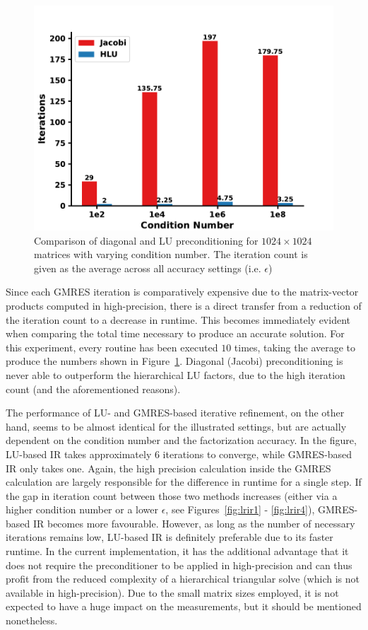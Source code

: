 \begin{figure}[h]
    \centering
    \includegraphics[width=0.7\linewidth]{chapters/5_experiments/figures/LR_iter.pdf}
    \caption[Low-Rank IR - GMRES Iterations]{Comparison of diagonal and LU preconditioning for $1024 \times 1024$ matrices with varying condition number. The iteration count is given as the average across all accuracy settings (i.e. $\epsilon$)}
    \label{fig:lr_ir_iter}
\end{figure}

Since each GMRES iteration is comparatively expensive due to the matrix-vector products computed in high-precision, there is a direct transfer from a reduction of the iteration count to a decrease in runtime. This becomes immediately evident when comparing the total time necessary to produce an accurate solution. For this experiment, every routine has been executed $10$ times, taking the average to produce the numbers shown in Figure~\hyperref[fig:lr_ir_iter]{\ref{fig:lr_ir_iter}}. Diagonal (Jacobi) preconditioning is never able to outperform the hierarchical LU factors, due to the high iteration count (and the aforementioned reasons). 

The performance of LU- and GMRES-based iterative refinement, on the other hand, seems to be almost identical for the illustrated settings, but are actually dependent on the condition number and the factorization accuracy. In the figure, LU-based IR takes approximately 6 iterations to converge, while GMRES-based IR only takes one. Again, the high precision calculation inside the GMRES calculation are largely responsible for the difference in runtime for a single step. If the gap in iteration count between those two methods increases (either via a higher condition number or a lower $\epsilon$, see Figures~\hyperref[fig:lrir1]{\ref{fig:lrir1}} - \hyperref[fig:lrir4]{\ref{fig:lrir4}}), GMRES-based IR becomes more favourable. However, as long as the number of necessary iterations remains low, LU-based IR is definitely preferable due to its faster runtime. In the current implementation, it has the additional advantage that it does not require the preconditioner to be applied in high-precision and can thus profit from the reduced complexity of a hierarchical triangular solve (which is not available in high-precision). Due to the small matrix sizes employed, it is not expected to have a huge impact on the measurements, but it should be mentioned nonetheless.

